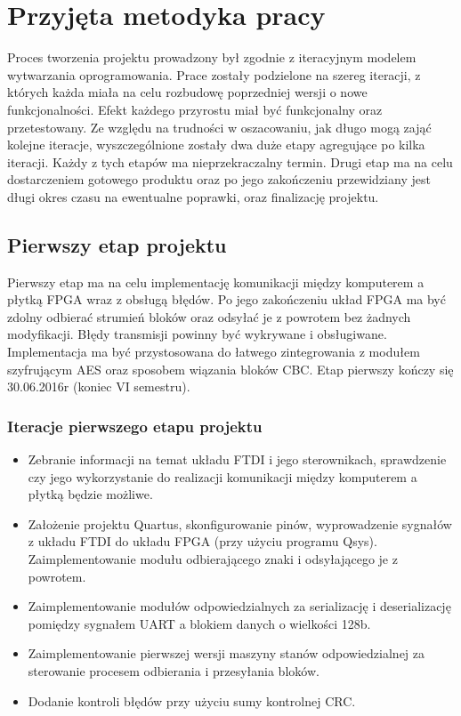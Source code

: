 \section{Przyjęta metodyka pracy}
\label{sec:przyjeta-metodyka-pracy}
Proces tworzenia projektu prowadzony był zgodnie z iteracyjnym modelem wytwarzania oprogramowania. Prace zostały podzielone na szereg iteracji, z których każda miała na celu rozbudowę poprzedniej wersji o nowe funkcjonalności. Efekt każdego przyrostu miał być funkcjonalny oraz przetestowany.
\newline
Ze względu na trudności w oszacowaniu, jak długo mogą zająć kolejne iteracje, wyszczególnione zostały dwa duże etapy agregujące po kilka iteracji. Każdy z tych etapów ma nieprzekraczalny termin. Drugi etap ma na celu dostarczeniem gotowego produktu oraz po jego zakończeniu przewidziany jest długi okres czasu na ewentualne poprawki, oraz finalizację projektu.

\subsection{Pierwszy etap projektu}
Pierwszy etap ma na celu implementację komunikacji między komputerem a płytką FPGA wraz z obsługą błędów. Po jego zakończeniu układ FPGA ma być zdolny odbierać strumień bloków oraz odsyłać je z powrotem bez żadnych modyfikacji. Błędy transmisji powinny być wykrywane i obsługiwane. Implementacja ma być przystosowana do łatwego zintegrowania z modułem szyfrującym AES oraz sposobem wiązania bloków CBC. Etap pierwszy kończy się 30.06.2016r (koniec VI semestru).

\subsubsection{Iteracje pierwszego etapu projektu}
\begin{itemize}
\item Zebranie informacji na temat układu FTDI i jego sterownikach, sprawdzenie czy jego wykorzystanie do realizacji komunikacji między komputerem a płytką będzie możliwe.
\item Założenie projektu Quartus, skonfigurowanie pinów, wyprowadzenie sygnałów z układu FTDI do układu FPGA (przy użyciu programu Qsys). Zaimplementowanie modułu odbierającego znaki i odsyłającego je z powrotem.
\item Zaimplementowanie modułów odpowiedzialnych za serializację i deserializację pomiędzy sygnałem UART a blokiem danych o wielkości 128b.
\item Zaimplementowanie pierwszej wersji maszyny stanów odpowiedzialnej za sterowanie procesem odbierania i przesyłania bloków.
\item Dodanie kontroli błędów przy użyciu sumy kontrolnej CRC.
\end{itemize}

